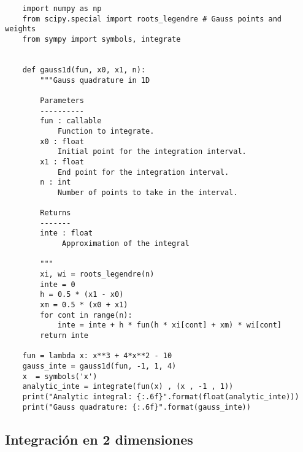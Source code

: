 \begin{verbatim}
    import numpy as np
    from scipy.special import roots_legendre # Gauss points and weights
    from sympy import symbols, integrate
    
    
    def gauss1d(fun, x0, x1, n):
        """Gauss quadrature in 1D
        
        Parameters
        ----------
        fun : callable
            Function to integrate.
        x0 : float
            Initial point for the integration interval.
        x1 : float
            End point for the integration interval.
        n : int
            Number of points to take in the interval.
        
        Returns
        -------
        inte : float
             Approximation of the integral
        
        """
        xi, wi = roots_legendre(n)
        inte = 0
        h = 0.5 * (x1 - x0)
        xm = 0.5 * (x0 + x1)
        for cont in range(n):
            inte = inte + h * fun(h * xi[cont] + xm) * wi[cont]
        return inte

    fun = lambda x: x**3 + 4*x**2 - 10
    gauss_inte = gauss1d(fun, -1, 1, 4)
    x  = symbols('x')
    analytic_inte = integrate(fun(x) , (x , -1 , 1))
    print("Analytic integral: {:.6f}".format(float(analytic_inte)))
    print("Gauss quadrature: {:.6f}".format(gauss_inte))
\end{verbatim}


\subsection{Integración en 2 dimensiones}

